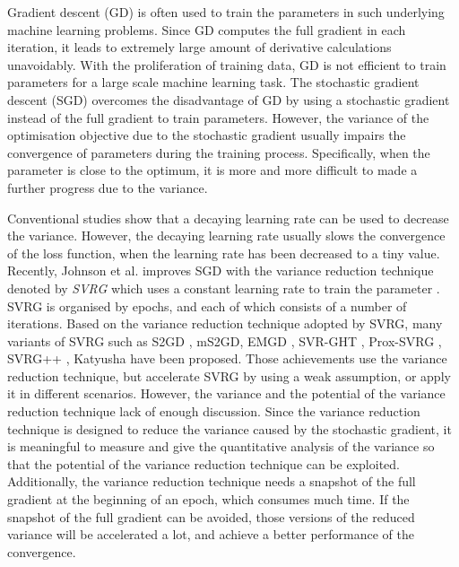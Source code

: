 \documentclass[letterpaper]{article}
\begin{document}
Gradient descent (GD) is often used to train the parameters in such underlying machine learning problems. Since GD computes the full gradient  in each iteration, it leads to extremely large amount of derivative calculations unavoidably. With the proliferation of training data, GD is not efficient to train parameters for a large scale machine learning task. The stochastic gradient descent (SGD) overcomes the disadvantage of GD by using a stochastic gradient instead of the full gradient to train parameters. However, the variance of the optimisation objective due to the stochastic gradient usually impairs the convergence of parameters during the training process. Specifically, when the parameter is close to the optimum, it is more and more difficult to made a further progress  due to the variance.

Conventional studies show that a decaying learning rate can be used to decrease the variance. However, the decaying learning rate usually slows the convergence of the loss function, when the learning rate has been decreased to a tiny value. Recently, Johnson et al. improves SGD with the variance reduction technique denoted by \emph{SVRG} which uses a constant learning rate to train the parameter \cite{Johnson:9MAvkbgy}. SVRG is organised by epochs, and each of which consists of a number of iterations.  Based on the variance reduction technique adopted by SVRG, many variants of SVRG such as S2GD \cite{Richtarik:2013te}, mS2GD\cite{Liu:2015bx}, EMGD \cite{Zhang2013Linear}, SVR-GHT \cite{Li:2016vh}, Prox-SVRG \cite{Xiao:2014vw}, SVRG++ \cite{Allen2015Improved}, Katyusha \cite{Allenzhu2016Katyusha} have been proposed. Those achievements use the variance reduction technique, but accelerate SVRG by using a weak assumption, or apply it in different scenarios. However,  the variance and the potential of the variance reduction technique lack of enough discussion. Since the variance reduction technique is designed  to reduce the variance caused by the stochastic gradient, it is meaningful to measure and give the quantitative analysis  of the variance so that the potential of the variance reduction technique can be exploited.  Additionally, the variance reduction technique needs a snapshot of the full gradient at the beginning of an epoch, which consumes much time. If the snapshot of the full gradient can be avoided, those versions of the reduced variance will be accelerated a lot, and achieve a better performance of the convergence.
 
\end{document}
